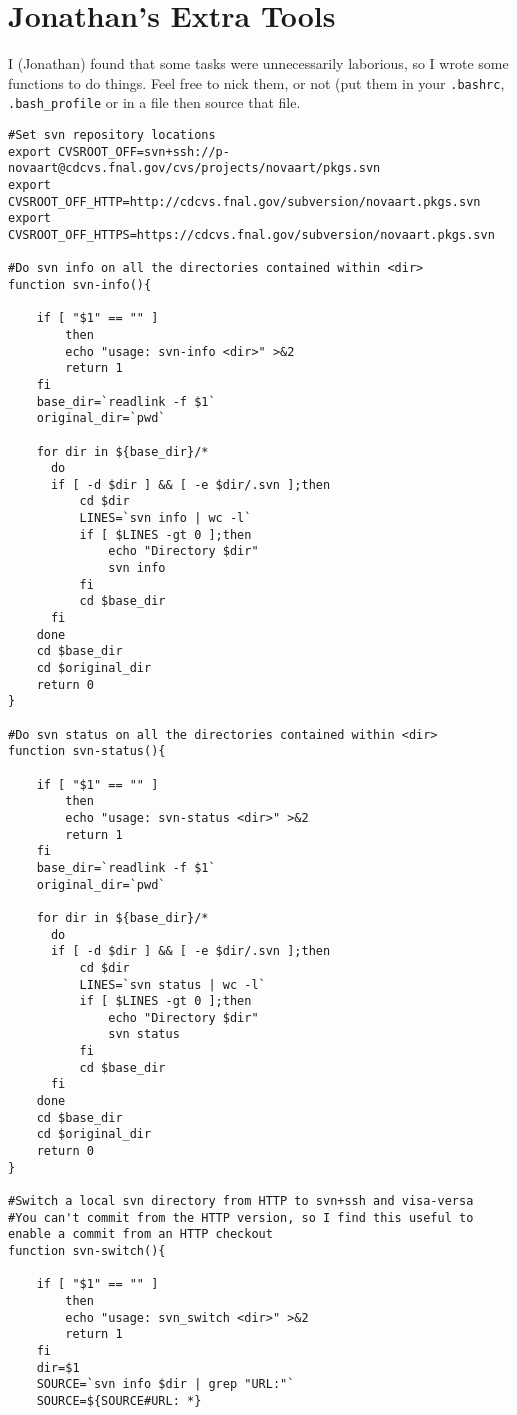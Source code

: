 \documentclass[letterpaper,10pt]{article}
\begin{document}
\section{Jonathan's Extra Tools}

I (Jonathan) found that some tasks were unnecessarily laborious, so I wrote some functions to do things. Feel free to nick them, or not (put them in your \verb|.bashrc|, \verb|.bash_profile| or in a file then source that file.


\begin{verbatim}
#Set svn repository locations                                                                                        
export CVSROOT_OFF=svn+ssh://p-novaart@cdcvs.fnal.gov/cvs/projects/novaart/pkgs.svn
export CVSROOT_OFF_HTTP=http://cdcvs.fnal.gov/subversion/novaart.pkgs.svn
export CVSROOT_OFF_HTTPS=https://cdcvs.fnal.gov/subversion/novaart.pkgs.svn

#Do svn info on all the directories contained within <dir>
function svn-info(){

    if [ "$1" == "" ]
        then
        echo "usage: svn-info <dir>" >&2
        return 1
    fi
    base_dir=`readlink -f $1`
    original_dir=`pwd`

    for dir in ${base_dir}/*
      do
      if [ -d $dir ] && [ -e $dir/.svn ];then
          cd $dir
          LINES=`svn info | wc -l`
          if [ $LINES -gt 0 ];then
              echo "Directory $dir"
              svn info
          fi
          cd $base_dir
      fi
    done
    cd $base_dir
    cd $original_dir
    return 0
}

#Do svn status on all the directories contained within <dir>
function svn-status(){

    if [ "$1" == "" ]
        then
        echo "usage: svn-status <dir>" >&2
        return 1
    fi
    base_dir=`readlink -f $1`
    original_dir=`pwd`

    for dir in ${base_dir}/*
      do
      if [ -d $dir ] && [ -e $dir/.svn ];then
          cd $dir
          LINES=`svn status | wc -l`
          if [ $LINES -gt 0 ];then
              echo "Directory $dir"
              svn status
          fi
          cd $base_dir
      fi
    done
    cd $base_dir
    cd $original_dir
    return 0
}

#Switch a local svn directory from HTTP to svn+ssh and visa-versa
#You can't commit from the HTTP version, so I find this useful to enable a commit from an HTTP checkout
function svn-switch(){

    if [ "$1" == "" ]
        then
        echo "usage: svn_switch <dir>" >&2
        return 1
    fi
    dir=$1
    SOURCE=`svn info $dir | grep "URL:"`
    SOURCE=${SOURCE#URL: *}


\end{verbatim}
\end{document}
